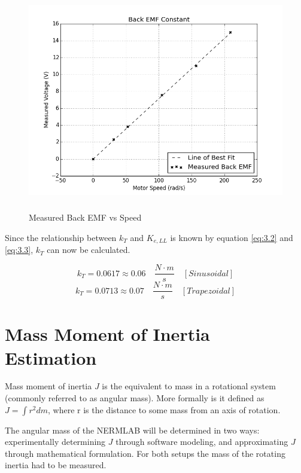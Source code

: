 \begin{figure}[H]%
	\begin{center}
		\includegraphics[height=3.8in]{figures/back_emf_plot.png}
		
		\caption[Measured Back EMF vs Speed]{Measured Back EMF vs Speed}
		
		\label{back_emf_plot}
	\end{center}
\end{figure}

Since the relationship between \(k_T\) and \(K_{e,LL}\) is known by equation \ref{eq:3.2} and \ref{eq:3.3}, \(k_T\) can now be calculated.
\begin{tcolorbox}[
    standard jigsaw,
    opacityback=0]
\[k_T = 0.0617 \approx 0.06 \quad \frac{N \cdot m}{s} \quad [Sinusoidal]\]
\[k_T =  0.0713 \approx 0.07 \quad  \frac{N \cdot m}{s} \quad [Trapezoidal]\]
\end{tcolorbox}

\newpage
\section{Mass Moment of Inertia Estimation}
Mass moment of inertia \(J\) is the equivalent to mass in a rotational system (commonly referred to as angular mass). More formally is it defined as \(J = \int r^2 dm\), where r is the distance to some mass from an axis of rotation.

The angular mass of the NERMLAB will be determined in two ways: experimentally determining \(J\) through software modeling, and approximating \(J\) through mathematical formulation. For both setups the mass of the rotating inertia had to be measured.

